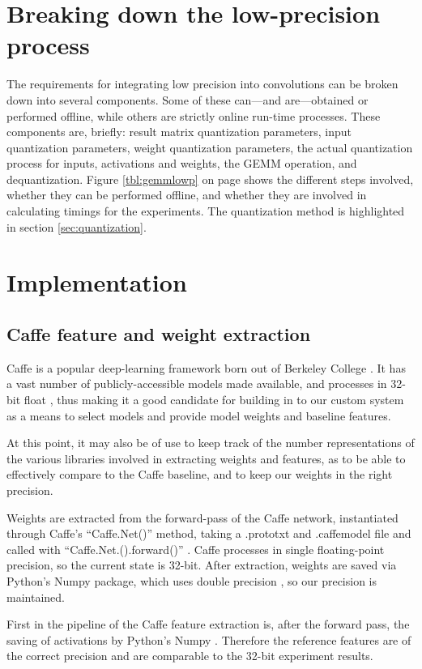 \section{Breaking down the low-precision process}
The requirements for integrating low precision into convolutions can be broken down into several components. Some of these can---and are---obtained or performed offline, while others are strictly online run-time processes. These components are, briefly: result matrix quantization parameters, input quantization parameters, weight quantization parameters, the actual quantization process for inputs, activations and weights, the GEMM operation, and dequantization. Figure \ref{tbl:gemmlowp} on page \pageref{tbl:gemmlowp} shows the different steps involved, whether they can be performed offline, and whether they are involved in calculating timings for the experiments. The quantization method is highlighted in section \ref{sec:quantization}.

\section{Implementation}
\subsection{Caffe feature and weight extraction}
\label{sec:caffe}
Caffe is a popular deep-learning framework born out of Berkeley College \cite{caffe}. It has a vast number of publicly-accessible models made available, and processes in 32-bit float \cite{caffe}, thus making it a good candidate for building in to our custom system as a means to select models and provide model weights and baseline features.

At this point, it may also be of use to keep track of the number representations of the various libraries involved in extracting weights and features, as to be able to effectively compare to the Caffe baseline, and to keep our weights in the right precision.

Weights are extracted from the forward-pass of the Caffe network, instantiated through Caffe's ``Caffe.Net()'' method, taking a .prototxt and .caffemodel file and called with ``Caffe.Net.().forward()'' \cite{caffe}. Caffe processes in single floating-point precision, so the current state is 32-bit. After extraction, weights are saved via Python's Numpy package, which uses double precision \cite{scipy}, so our precision is maintained.

First in the pipeline of the Caffe feature extraction is, after the forward pass, the saving of activations by Python's Numpy \cite{scipy}. Therefore the reference features are of the correct precision and are comparable to the 32-bit experiment results.

